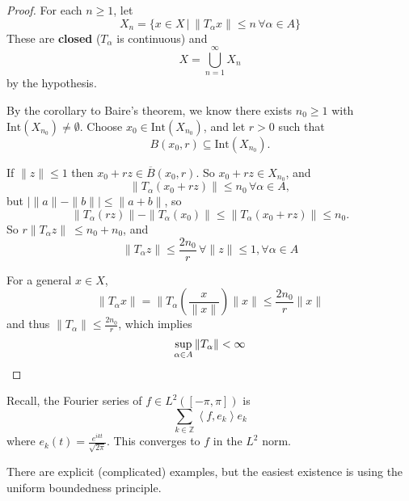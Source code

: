 \documentclass[justified]{tufte-book}
\theoremstyle{plain}%
\theoremstyle{definition}
\newtheorem{exer}[thm]{Exercise}
\theoremstyle{remark}
\newcommand{\given}{ \, | \,}
\newcommand{\Z}{\mathbb{Z}}
\newcommand{\iprod}[1]{\left\langle #1 \right\rangle}
\begin{document}
\begin{proof}
  For each $n \geq 1$, let \[
      X_n = \{ x \in X \given \| T_\alpha x \| \leq n \, \forall \alpha \in A \}
  \]  These are \textbf{closed} ($T_{\alpha}$ is continuous) and \[
      X = \bigcup_{n=1}^\infty X_n
  \] by the hypothesis.
  
  By the corollary to Baire's theorem, we know there exists $n_0 \geq 1$ with $\text{Int}(X_{n_0}) \neq \emptyset$.  Choose $x_0 \in \text{Int}(X_{n_0})$, and let $r > 0$ such that \[
      B(x_0, r) \subseteq \text{Int}(X_{n_0}).  
  \]  
  
  If $\| z \| \leq 1$ then $x_0 + rz \in \overline B (x_0, r)$. So $x_0 + rz \in X_{n_0}$, and \[
      \| T_\alpha(x_0 + rz) \| \leq n_0 \, \forall \alpha \in A,
  \]  but $| \| a \| - \| b \| | \leq \| a + b \|$, so \[
      \| T_\alpha (rz) \| - \| T_\alpha (x_0) \| \leq \| T_\alpha (x_0 + rz) \| \leq n_0.
  \]
  So $r \| T_\alpha z \| \ \leq n_0 + n_0$, and \[
      \| T_\alpha z \| \leq \frac{2 n_0}{r} \, \forall \| z \| \leq 1, \forall \alpha \in A
  \]
  
  For a general $x \in X$, \[
      \| T_\alpha x \| = \| T_\alpha ( \frac{x}{\| x \|}) \| x \| \leq \frac{2 n_0}{r} \| x \|
  \] and thus $\|T_\alpha \| \leq \frac{2 n_0}{r}$, which implies \[
      \sup_{\alpha \in A} \| T_\alpha \| < \infty \qedhere
  \]
  
  
\end{proof}

Recall, the Fourier series of $f \in L^2([-\pi, \pi])$ is \[
  \sum_{k \in \Z} \iprod{f, e_k} e_k
\] where $e_k(t) = \frac{e^{ikt}}{\sqrt{2 \pi}}$.  This converges to $f$ in the $L^2$ norm.

There are explicit (complicated) examples, but the easiest existence is using the uniform boundedness principle.  
\end{document}
